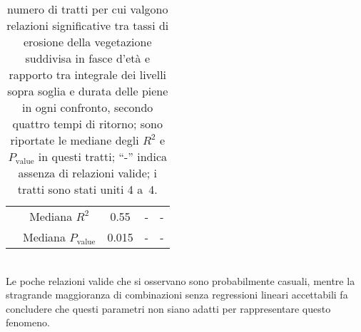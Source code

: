 \begin{table}
\begin{tabular}{c c *{3}{S[table-format = 2.3, table-comparator = true]}}
			&	Mediana $R^2$	&	0.55	&	{-}	&	{-}	\\
			&	Mediana $P_\mathrm{value}$	&	0.015	&	{-}	&	{-}	\\
		\bottomrule
	\end{tabular}
	\caption[numero di tratti nei gruppi di~4 tratti con relazioni significative considerando i tassi di erosione e i livelli medi sopra soglia durante le piene]{numero di tratti per cui valgono relazioni significative tra tassi di erosione della vegetazione suddivisa in fasce d'età e rapporto tra integrale dei livelli sopra soglia e durata delle piene in ogni confronto, secondo quattro tempi di ritorno; sono riportate le mediane degli $R^2$ e $P_\mathrm{value}$ in questi tratti; “-” indica assenza di relazioni valide; i tratti sono stati uniti 4 a~4.}
	\label{tab:iote-4tr-lin-tuttep-ntr-r2-pval}
\end{table}
%
\\
Le poche relazioni valide che si osservano sono probabilmente casuali, mentre la stragrande maggioranza di combinazioni senza regressioni lineari accettabili fa concludere che questi parametri non siano adatti per rappresentare questo fenomeno.


